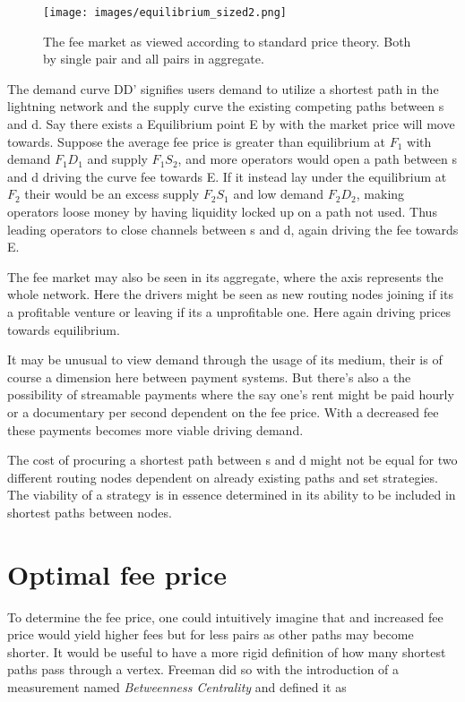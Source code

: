\begin{figure}[!htb]
	\hspace*{-0.3cm} 
	\centering
	\texttt{[image: images/equilibrium\_sized2.png]}
	\caption{ The fee market as viewed according to standard price theory. Both by single pair and all pairs in aggregate. 
		}
		\label{fig:equilibrium}
		\hspace*{2mm} 	
\end{figure}

The demand curve DD' signifies users demand to utilize a shortest path in the lightning network and the supply curve the existing competing paths between s and d. Say there exists a Equilibrium point E by with the market price will move towards. Suppose the average fee price is greater than equilibrium at $F_{1}$ with demand $F_{1}D_{1}$ and supply $F_{1}S_{2}$, and more operators would open a path between s and d driving the curve fee towards E. If it instead lay under the equilibrium at $F_2$ their would be an excess supply $F_{2}S_{1}$ and low demand $F_{2}D_{2}$, making operators loose money by having liquidity locked up on a path not used. Thus leading operators to close channels between s and d, again driving the fee towards E.

The fee market may also be seen in its aggregate, where the axis represents the whole network. Here the drivers might be seen as new routing nodes joining if its a profitable venture or leaving if its a unprofitable one. Here again driving prices towards equilibrium. 

It may be unusual to view demand through the usage of its medium, their is of course a dimension here between payment systems. But there's also a the possibility of streamable payments where the say one's rent might be paid hourly or a documentary per second dependent on the fee price. With a decreased fee these payments becomes more viable driving demand.

The cost of procuring a shortest path between s and d might not be equal for two different routing nodes dependent on already existing paths and set strategies. The viability of a strategy is in essence determined in its ability to be included in shortest paths between nodes.

\section{Optimal fee price}

To determine the fee price, one could intuitively imagine that and increased fee price would yield higher fees but for less pairs as other paths may become shorter. It would be useful to have a more rigid definition of how many shortest paths pass through a vertex. Freeman did so with the introduction of a measurement named \textit{Betweenness Centrality}\cite{freeman:betweenness:centrality} and defined it as

